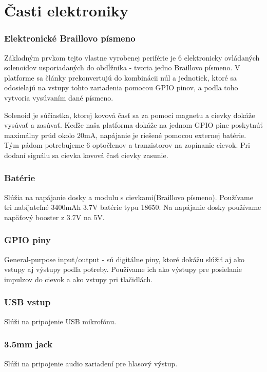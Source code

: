 \documentclass{template/socthesis}
\begin{document}
\section{Časti elektroniky}
\subsubsection{Elektronické Braillovo písmeno}
Základným prvkom tejto vlastne vyrobenej periférie je 6 elektronicky ovládaných solenoidov usporiadaných do obdĺžnika - tvoria jedno Braillovo písmeno. V platforme sa články prekonvertujú do kombinácii núl a jednotiek, ktoré sa odosielajú na vstupy tohto zariadenia pomocou GPIO pinov, a podľa toho vytvoria vysúvaním dané písmeno. 

Solenoid je súčiastka, ktorej kovová časť sa za pomoci magnetu a cievky dokáže vysúvať a zasúvať. Keďže naša platforma dokáže na jednom GPIO pine poskytnúť maximálny prúd okolo 20mA, napájanie je riešené pomocou externej batérie. Tým pádom potrebujeme 6 optočlenov a tranzistorov na zopínanie cievok. Pri dodaní signálu sa cievka kovová časť cievky zasunie.

\subsubsection{Batérie}
Slúžia na napájanie dosky a modulu s cievkami(Braillovo písmeno). Používame tri nabíjateľné 3400mAh 3.7V batérie typu 18650. Na napájanie dosky používame napäťový booster z 3.7V na 5V.

\subsubsection{GPIO piny}
General-purpose input/output - sú digitálne piny, ktoré dokážu slúžiť aj ako vstupy aj výstupy podľa potreby. Používame ich ako výstupy pre posielanie impulzov do cievok a ako vstupy pri tlačidlách. 

\subsubsection{USB vstup}
Slúži na pripojenie USB mikrofónu.

\subsubsection{3.5mm jack}
Slúži na pripojenie audio zariadení pre hlasový výstup.
\end{document}
